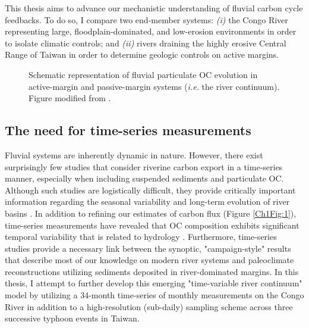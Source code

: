 This thesis aims to advance our mechanistic understanding of fluvial carbon cycle feedbacks. To do so, I compare two end-member systems: \textit{(i)} the Congo River representing large, floodplain-dominated, and low-erosion environments in order to isolate climatic controls; and \textit{(ii)} rivers draining the highly erosive Central Range of Taiwan in order to determine geologic controls on active margins.

\begin{figure}[t]
	\caption[Schematic representation of the river continuum]{Schematic representation of fluvial particulate OC evolution in active-margin and passive-margin systems (\textit{i.e.} the river continuum). Figure modified from \citet{Blair:2012du}.}
	\label{Ch1Fig:3} 
\end{figure}

\subsection{The need for time-series measurements}

Fluvial systems are inherently dynamic in nature. However, there exist surprisingly few studies that consider riverine carbon export in a time-series manner, especially when including suspended sediments and particulate OC. Although such studies are logistically difficult, they provide critically important information regarding the seasonal variability and long-term evolution of river basins \citep[\textit{e.g.}][]{Peterson:2002hj,Raymond:2003fd,Milliman:2011ug,Voss:2015dd}. In addition to refining our estimates of carbon flux (Figure \ref{Ch1Fig:1}), time-series measurements have revealed that OC composition exhibits significant temporal variability that is related to hydrology \citep{Voss:2015dd,Hemingway:2016bq}. Furthermore, time-series studies provide a necessary link between the synoptic, "campaign-style" results that describe most of our knowledge on modern river systems and paleoclimate reconstructions utilizing sediments deposited in river-dominated margins. In this thesis, I attempt to further develop this emerging "time-variable river continuum" model by utilizing a 34-month time-series of monthly measurements on the Congo River in addition to a high-resolution (sub-daily) sampling scheme across three successive typhoon events in Taiwan. 

